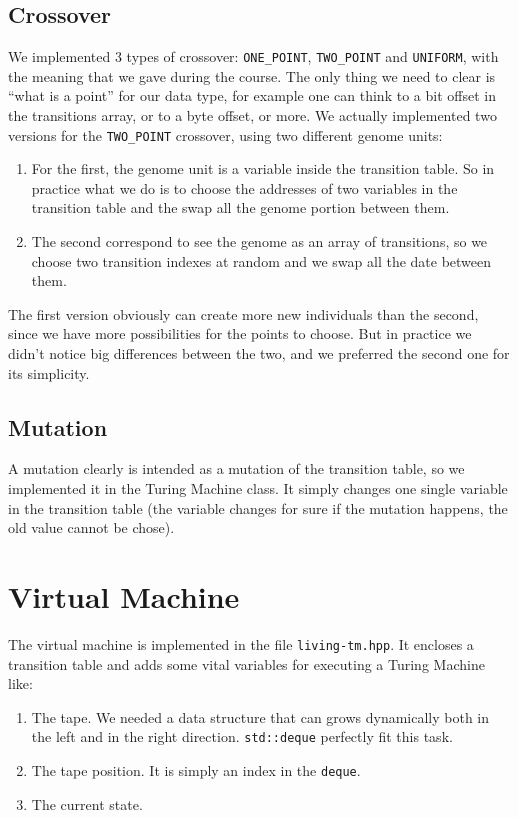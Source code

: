 \documentclass{report}
\begin{document}
\subsection{Crossover}
\label{sec:crossover}
We implemented 3 types of crossover: \texttt{ONE\_POINT}, \texttt{TWO\_POINT} and \texttt{UNIFORM}, with the meaning that we gave during the course. The only thing we need to clear is ``what is a point'' for our data type, for example one can think to a bit offset in the transitions array, or to a byte offset, or more.
We actually implemented two versions for the \texttt{TWO\_POINT} crossover, using two different genome units:

\begin{enumerate}
\item For the first, the genome unit is a variable inside the transition table. So in practice what we do is to choose the addresses of two variables in the transition table and the swap all the genome portion between them.
\item The second correspond to see the genome as an array of transitions, so we choose two transition indexes at random and we swap all the date between them.
\end{enumerate}

The first version obviously can create more new individuals than the second, since we have more possibilities for the points to choose. But in practice we didn't notice big differences between the two, and we preferred the second one for its simplicity.

\subsection{Mutation}
\label{sec:mutation}
A mutation clearly is intended as a mutation of the transition table, so we implemented it in the Turing Machine class. It simply changes one single variable in the transition table (the variable changes for sure if the mutation happens, the old value cannot be chose).



\section{Virtual Machine}
The virtual machine is implemented in the file \texttt{living-tm.hpp}. It encloses a transition table and adds some vital variables for executing a Turing Machine like:

\begin{enumerate}
\item The tape. We needed a data structure that can grows dynamically both in the left and in the right direction. \texttt{std::deque} perfectly fit this task.
\item The tape position. It is simply an index in the \texttt{deque}.
\item The current state.
\end{enumerate}
\end{document}
